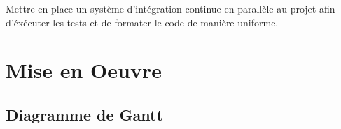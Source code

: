 \documentclass[12pt]{report}
\begin{document}
Mettre en place un système d'intégration continue en parallèle au projet afin d'éxécuter les tests et de formater le code de manière uniforme.


\newpage

\chapter*{Mise en Oeuvre}
\setcounter{chapter}{4}




\section{Diagramme de Gantt}



{}

\end{document}
